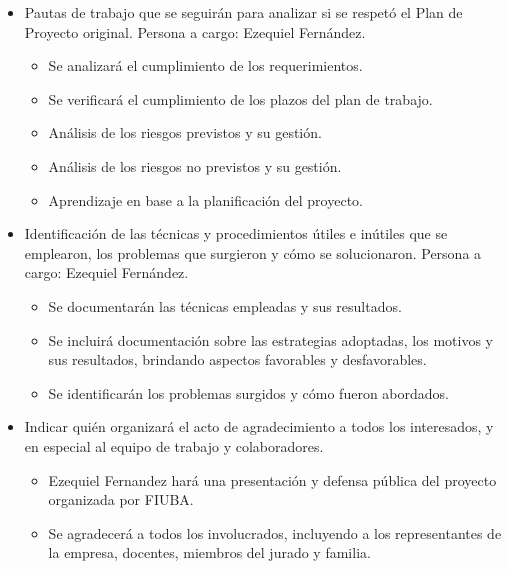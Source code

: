 \documentclass[
11pt, %
]{charter}
\begin{document}
\begin{itemize}
	\item Pautas de trabajo que se seguirán para analizar si se respetó el Plan de Proyecto original.
	Persona a cargo: Ezequiel Fernández.
	\begin{itemize}
		\item Se analizará el cumplimiento de los requerimientos.
		\item Se verificará el cumplimiento de los plazos del plan de trabajo.
		\item Análisis de los riesgos previstos y su gestión.
		\item Análisis de los riesgos no previstos y su gestión.
		\item Aprendizaje en base a la planificación del proyecto.
	\end{itemize}
	\item Identificación de las técnicas y procedimientos útiles e inútiles que se emplearon, los problemas que surgieron y cómo se solucionaron.
		Persona a cargo: Ezequiel Fernández.
	\begin{itemize}
		\item Se documentarán las técnicas empleadas y sus resultados.
		\item Se incluirá documentación sobre las estrategias adoptadas, los motivos y sus resultados, brindando aspectos favorables y desfavorables.
		\item Se identificarán los problemas surgidos y cómo fueron abordados.
	\end{itemize}
	\item Indicar quién organizará el acto de agradecimiento a todos los interesados, y en especial al equipo de trabajo y colaboradores.
	\begin{itemize}
		\item Ezequiel Fernandez hará una presentación y defensa pública del proyecto organizada por FIUBA.
		\item Se agradecerá a todos los involucrados, incluyendo a los representantes de la empresa, docentes, miembros del jurado y familia.
	\end{itemize}
\end{itemize}
\end{document}
